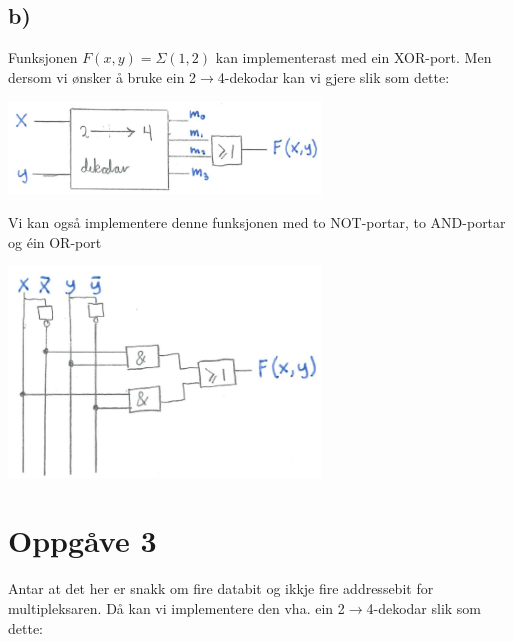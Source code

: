 \documentclass[12pt,a4paper]{article}
\begin{document}
      \subsection{b)}
        Funksjonen $F(x,y) = \Sigma(1,2)$ kan implementerast med ein XOR-port. Men dersom vi
        ønsker å bruke ein 2$\rightarrow$4-dekodar kan vi gjere slik som dette:

        \begin{center}
          \includegraphics[width=83mm]{03_2b2}
        \end{center}
        Vi kan også implementere denne funksjonen med to NOT-portar, to AND-portar og éin OR-port
        \begin{center}
          \includegraphics[width=83mm]{03_2b}
        \end{center}

    \section{Oppgåve 3}
      Antar at det her er snakk om fire databit og ikkje fire addressebit for multipleksaren.
      Då kan vi implementere den vha. ein 2$\rightarrow$4-dekodar slik som dette:
\end{document}

